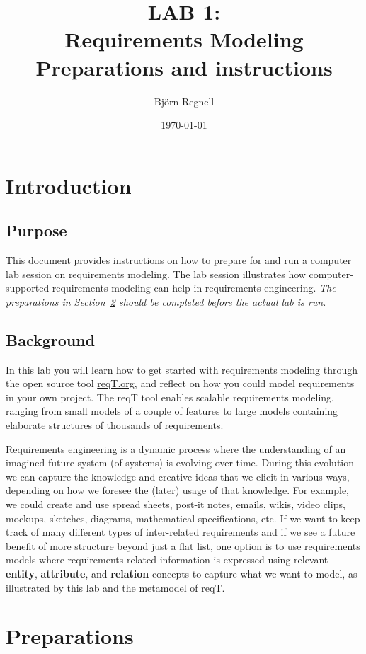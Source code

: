 \documentclass[11pt]{article}
\title{{\bf LAB 1:\\Requirements Modeling}\\ Preparations and instructions}
\author{Björn Regnell}
\date{\today}
\begin{document}
\maketitle

\section{Introduction}

\subsection{Purpose} This document provides instructions on how to prepare for and run a computer lab session on requirements modeling. The lab session illustrates how computer-supported requirements modeling can help in requirements engineering. {\it The preparations in Section~\ref{section:prep} should be completed before the actual lab is run.}

\subsection{Background} In this lab you will learn how to get started with requirements modeling through the open source tool \href{http://reqT.org}{reqT.org}, and reflect on how you could model requirements in your own project. The reqT tool enables scalable requirements modeling, ranging from small models of a couple of features to large models containing elaborate structures of thousands of requirements. 

Requirements engineering is a dynamic process where the understanding of an imagined future system (of systems) is evolving over time. During this evolution we can capture the knowledge and creative ideas that we elicit in various ways, depending on how we foresee the (later) usage of that knowledge. For example, we could create and use spread sheets, post-it notes, emails, wikis, video clips, mockups, sketches, diagrams, mathematical specifications, etc. If we want to keep track of many different types of inter-related requirements and if we see a future benefit of more structure beyond just a flat list, one option is to use requirements models where requirements-related information is expressed using relevant {\bf entity}, {\bf attribute}, and {\bf relation} concepts to capture what we want to model, as illustrated by this lab and the metamodel of reqT. 

\clearpage\newpage
\section{Preparations}\label{section:prep}
\end{document}
